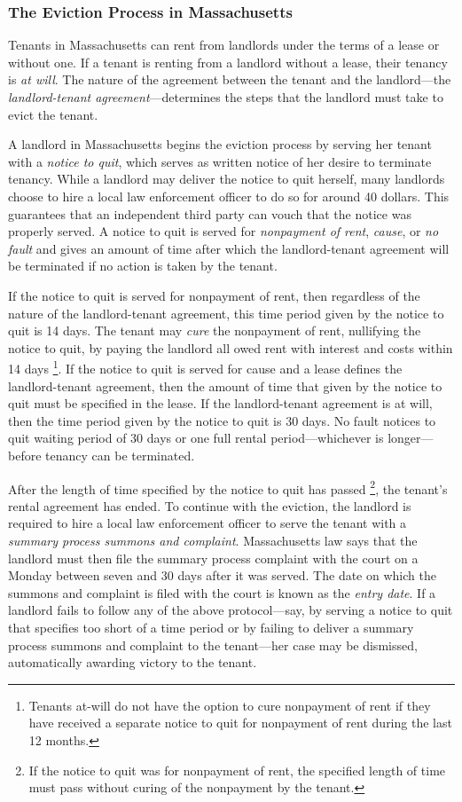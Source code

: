 \documentclass[12pt]{article}
\begin{document}
        
        \subsubsection{The Eviction Process in Massachusetts}
        Tenants in Massachusetts can rent from landlords under the terms of a lease or without one. If a tenant is renting from a landlord without a lease, their tenancy is \textit{at will}. The nature of the agreement between the tenant and the landlord—the \textit{landlord-tenant agreement}—determines the steps that the landlord must take to evict the tenant.

        
        A landlord in Massachusetts begins the eviction process by serving her tenant with a \textit{notice to quit}, which serves as written notice of her desire to terminate tenancy. While a landlord may deliver the notice to quit herself, many landlords choose to hire a local law enforcement officer to do so for around 40 dollars. This guarantees that an independent third party can vouch that the notice was properly served. A notice to quit is served for \textit{nonpayment of rent}, \textit{cause}, or \textit{no fault} and gives an amount of time after which the landlord-tenant agreement will be terminated if no action is taken by the tenant.
        
        If the notice to quit is served for nonpayment of rent, then regardless of the nature of the landlord-tenant agreement, this time period given by the notice to quit is 14 days. The tenant may \textit{cure} the nonpayment of rent, nullifying the notice to quit, by paying the landlord all owed rent with interest and costs within 14 days \footnote{Tenants at-will do not have the option to cure nonpayment of rent if they have received a separate notice to quit for nonpayment of rent during the last 12 months.}. If the notice to quit is served for cause and a lease defines the landlord-tenant agreement, then the amount of time that given by the notice to quit must be specified in the lease. If the landlord-tenant agreement is at will, then the time period given by the notice to quit is 30 days. No fault notices to quit waiting period of 30 days or one full rental period—whichever is longer—before tenancy can be terminated. 

        After the length of time specified by the notice to quit has passed \footnote{If the notice to quit was for nonpayment of rent, the specified length of time must pass without curing of the nonpayment by the tenant.}, the tenant's rental agreement has ended. To continue with the eviction, the landlord is required to hire a local law enforcement officer to serve the tenant with a \textit{summary process summons and complaint}. Massachusetts law says that the landlord must then file the summary process complaint with the court on a Monday between seven and 30 days after it was served. The date on which the summons and complaint is filed with the court is known as the \textit{entry date}. If a landlord fails to follow any of the above protocol—say, by serving a notice to quit that specifies too short of a time period or by failing to deliver a summary process summons and complaint to the tenant—her case may be dismissed, automatically awarding victory to the tenant.
\end{document}
